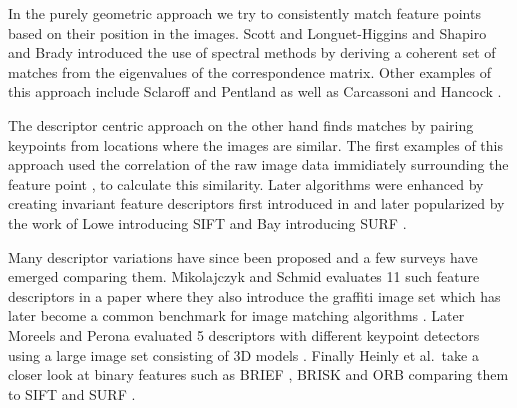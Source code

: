 \documentclass[journal]{IEEEtran}
\begin{document}
In the purely geometric approach we try to consistently match feature 
points based on their position in the images. Scott and Longuet-Higgins 
\cite{scott1991algorithm} and Shapiro and Brady 
\cite{shapiro1992feature} introduced the use of spectral methods by 
deriving a coherent set of matches from the eigenvalues of the 
correspondence matrix. Other examples of this approach include Sclaroff 
and Pentland \cite{sclaroff1995modal} as well as Carcassoni and Hancock 
\cite{carcassoni2003spectral}.

The descriptor centric approach on the other hand finds matches by 
pairing keypoints from locations where the images are similar. The first 
examples of this approach used the correlation of the raw image data 
immidiately surrounding the feature point \cite{deriche1994robust}, 
\cite{baumberg2000reliable} to calculate this similarity. Later 
algorithms were enhanced by creating invariant feature descriptors first 
introduced in \cite{schmid1997local} and later popularized by the work 
of Lowe introducing SIFT \cite{lowe2004sift} and Bay introducing SURF 
\cite{bay2006surf}.

Many descriptor variations have since been proposed and a few surveys 
have emerged comparing them. Mikolajczyk and Schmid evaluates 11 such 
feature descriptors in a paper where they also introduce the graffiti 
image set which has later become a common benchmark for image matching 
algorithms \cite{mikolajczyk2005performance}.  Later Moreels and Perona 
evaluated 5 descriptors with different keypoint detectors using a large 
image set consisting of 3D models \cite{moreels2007evaluation}. Finally 
Heinly et al.\ take a closer look at binary features such as BRIEF 
\cite{calonder2010brief}, BRISK \cite{leutenegger2011brisk} and ORB 
\cite{rublee2011orb} comparing them to SIFT and SURF 
\cite{heinly2012comparative}. 
\end{document}
